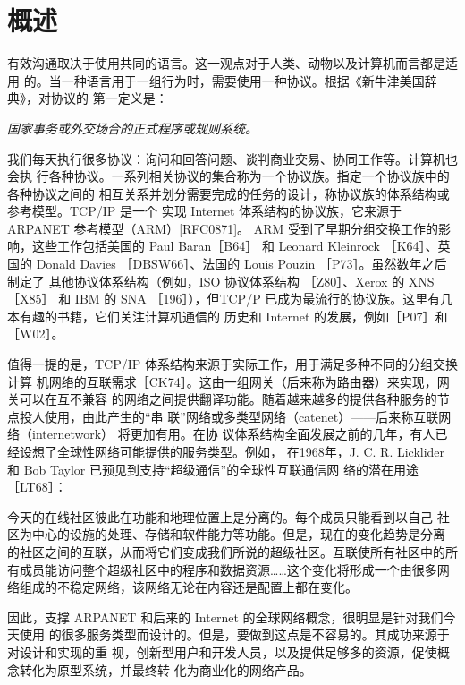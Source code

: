 \chapter{概述}

有效沟通取决于使用共同的语言。这一观点对于人类、动物以及计算机而言都是适用
的。当一种语言用于一组行为时，需要使用一种协议。根据《新牛津美国辞典》，对协议的
第一定义是：
\begin{center}
    \emph{国家事务或外交场合的正式程序或规则系统。}
\end{center}

我们每天执行很多协议：询问和回答问题、谈判商业交易、协同工作等。计算机也会执
行各种协议。一系列相关协议的集合称为一个协议族。指定一个协议族中的各种协议之间的
相互关系并划分需要完成的任务的设计，称协议族的体系结构或参考模型。TCP/IP 是一个
实现 Internet 体系结构的协议族，它来源于 ARPANET 参考模型（ARM）\href{https://www.rfc-editor.org/rfc/rfc0871}{[RFC0871]}。 ARM
受到了早期分组交换工作的影响，这些工作包括美国的 Paul Baran［B64］ 和 Leonard Kleinrock
［K64］、英国的 Donald Davies ［DBSW66］、法国的 Louis Pouzin ［P73］。虽然数年之后制定了
其他协议体系结构（例如，ISO 协议体系结构 ［Z80］、Xerox 的 XNS ［X85］ 和 IBM 的 SNA
［196］），但TCP/P 已成为最流行的协议族。这里有几本有趣的书籍，它们关注计算机通信的
历史和 Internet 的发展，例如［P07］和［W02］。

值得一提的是，TCP/IP 体系结构来源于实际工作，用于满足多种不同的分组交换计算
机网络的互联需求［CK74］。这由一组网关（后来称为路由器）来实现，网关可以在互不兼容
的网络之间提供翻译功能。随着越来越多的提供各种服务的节点投人使用，由此产生的“串
联”网络或多类型网络（catenet）——后来称互联网络（internetwork） 将更加有用。在协
议体系结构全面发展之前的几年，有人已经设想了全球性网络可能提供的服务类型。例如，
在1968年，J. C. R. Licklider 和 Bob Taylor 已预见到支持“超级通信”的全球性互联通信网
络的潜在用途 ［LT68］：

今天的在线社区彼此在功能和地理位置上是分离的。每个成员只能看到以自己
社区为中心的设施的处理、存储和软件能力等功能。但是，现在的变化趋势是分离
的社区之间的互联，从而将它们变成我们所说的超级社区。互联使所有社区中的所
有成员能访问整个超级社区中的程序和数据资源……这个变化将形成一个由很多网
络组成的不稳定网络，该网络无论在内容还是配置上都在变化。

因此，支撑 ARPANET 和后来的 Internet 的全球网络概念，很明显是针对我们今天使用
的很多服务类型而设计的。但是，要做到这点是不容易的。其成功来源于对设计和实现的重
视，创新型用户和开发人员，以及提供足够多的资源，促使概念转化为原型系统，并最终转
化为商业化的网络产品。

